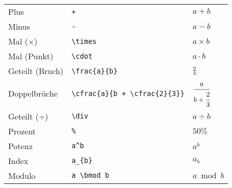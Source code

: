 \begin{longtable}{l l l}
    \midrule
    Plus                      & \texttt{+}                                                                               & $ a + b $                            \\
    Minus                     & \texttt{-}                                                                               & $ a - b $                            \\
    Mal (×)                   & \texttt{\textbackslash times}                                                            & $ a \times b $                       \\
    Mal (Punkt)               & \texttt{\textbackslash cdot}                                                             & $ a \cdot b $                        \\
    Geteilt (Bruch)           & \texttt{\textbackslash frac\{a\}\{b\}}                                                   & $ \frac{a}{b} $                      \\
    Doppelbrüche              & \texttt{\textbackslash cfrac\{a\}\{b + \textbackslash cfrac\{2\}\{3\}\}}                 & $ \cfrac{a}{b + \cfrac{2}{3}} $      \\
    Geteilt (÷)               & \texttt{\textbackslash div}                                                              & $ a \div b $                         \\
    Prozent                   & \texttt{\%}                                                                              & $ 50\% $                             \\
    Potenz                    & \texttt{a\^{}b}                                                                          & $ a^b $                              \\
    Index                     & \texttt{a\_\{b\}}                                                                        & $ a_b $                              \\
    Modulo                    & \texttt{a \textbackslash bmod b}                                                         & $ a \bmod b $                        \\


\end{longtable}
